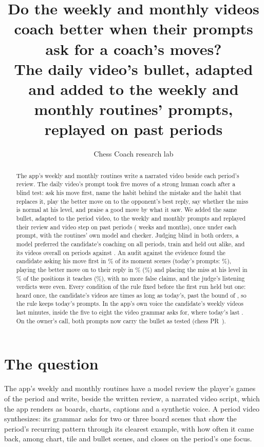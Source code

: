\documentclass[11pt]{article}
\title{Do the weekly and monthly videos coach better when their prompts ask for a coach's moves?\\[0.3em]
\large The daily video's bullet, adapted and added to the weekly and monthly routines' prompts,
replayed on \Cases{} past periods}
\author{Chess Coach research lab}
\date{}
\begin{document}
\maketitle

\begin{abstract}
The app's weekly and monthly routines write a narrated video beside each period's review. The
daily video's prompt took five moves of a strong human coach after a blind test: ask his move first,
name the habit behind the mistake and the habit that replaces it, play the better move on to the
opponent's best reply, say whether the miss is normal at his level, and praise a good move by what it
saw. We added the same bullet, adapted to the period video, to the weekly and monthly prompts and
replayed their review and video step on \Cases{} past periods (\WeeksN{} weeks and \MonthsN{}
months), once under each prompt, with the routines' own model and checker. Judging blind in both
orders, a model preferred the candidate's coaching on all \Cases{} periods, train and held out alike,
and its videos overall on \OverallWins{} periods against \OverallLosses. An audit against the evidence
found the candidate asking his move first in \CandOpenQuestion\% of its moment scenes (today's
prompts: \BaseOpenQuestion\%), playing the better move on to their reply in \CandThenWhat\%
(\BaseThenWhat\%) and placing the miss at his level in \CandToldLevel\% of the positions it teaches
(\BaseToldLevel\%), with no more false claims, and the judge's listening verdicts were even.
Every condition of the rule fixed before the first run held but one: heard once, the candidate's
videos are \LengthRatio{} times as long as today's, past the bound of \LengthCap, so the rule keeps
today's prompts. In the app's own voice the candidate's weekly videos last \CandWeekRendered{}
minutes, inside the five to eight the video grammar asks for, where today's last
\BaseWeekRendered. On the owner's call, both prompts now carry the bullet as tested (chess
PR~\PortPR).
\end{abstract}

\section{The question}

The app's weekly and monthly routines have a model review the player's games of the period and
write, beside the written review, a narrated video script, which the app renders as boards, charts,
captions and a synthetic voice. A period video synthesizes: its grammar asks for two or three board
scenes that show the period's recurring pattern through its clearest example, with how often it came
back, among chart, tile and bullet scenes, and closes on the period's one focus.
\end{document}
